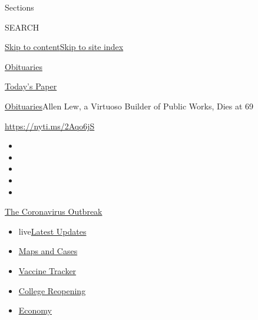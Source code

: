Sections

SEARCH

\protect\hyperlink{site-content}{Skip to
content}\protect\hyperlink{site-index}{Skip to site index}

\href{https://www.nytimes.com/section/obituaries}{Obituaries}

\href{https://myaccount.nytimes.com/auth/login?response_type=cookie\&client_id=vi}{}

\href{https://www.nytimes.com/section/todayspaper}{Today's Paper}

\href{/section/obituaries}{Obituaries}\textbar{}Allen Lew, a Virtuoso
Builder of Public Works, Dies at 69

\url{https://nyti.ms/2Aqo6jS}

\begin{itemize}
\item
\item
\item
\item
\item
\end{itemize}

\href{https://www.nytimes.com/news-event/coronavirus?action=click\&pgtype=Article\&state=default\&region=TOP_BANNER\&context=storylines_menu}{The
Coronavirus Outbreak}

\begin{itemize}
\tightlist
\item
  live\href{https://www.nytimes.com/2020/08/03/world/coronavirus-covid-19.html?action=click\&pgtype=Article\&state=default\&region=TOP_BANNER\&context=storylines_menu}{Latest
  Updates}
\item
  \href{https://www.nytimes.com/interactive/2020/us/coronavirus-us-cases.html?action=click\&pgtype=Article\&state=default\&region=TOP_BANNER\&context=storylines_menu}{Maps
  and Cases}
\item
  \href{https://www.nytimes.com/interactive/2020/science/coronavirus-vaccine-tracker.html?action=click\&pgtype=Article\&state=default\&region=TOP_BANNER\&context=storylines_menu}{Vaccine
  Tracker}
\item
  \href{https://www.nytimes.com/2020/08/02/us/covid-college-reopening.html?action=click\&pgtype=Article\&state=default\&region=TOP_BANNER\&context=storylines_menu}{College
  Reopening}
\item
  \href{https://www.nytimes.com/live/2020/08/03/business/stock-market-today-coronavirus?action=click\&pgtype=Article\&state=default\&region=TOP_BANNER\&context=storylines_menu}{Economy}
\end{itemize}

